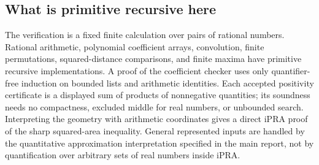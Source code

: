 \subsection{What is primitive recursive here}
The verification is a fixed finite calculation over pairs of rational
numbers.  Rational arithmetic, polynomial coefficient arrays, convolution,
finite permutations, squared-distance comparisons, and finite maxima have
primitive recursive implementations.  A proof of the coefficient checker
uses only quantifier-free induction on bounded lists and arithmetic
identities.  Each accepted positivity certificate is a displayed sum of
products of nonnegative quantities; its soundness needs no compactness,
excluded middle for real numbers, or unbounded search.  Interpreting the
geometry with arithmetic coordinates gives a direct iPRA proof of the
sharp squared-area inequality.  General represented inputs are handled by
the quantitative approximation interpretation specified in the main report,
not by quantification over arbitrary sets of real numbers inside iPRA.
